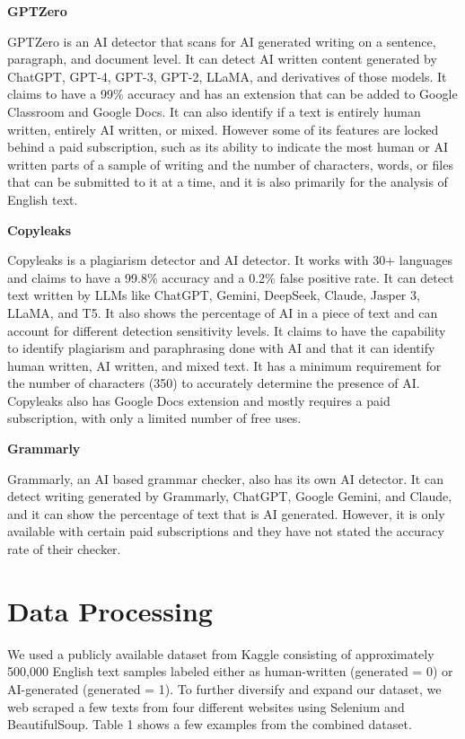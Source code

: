 \documentclass{article} %
\begin{document}
\textbf{GPTZero} ~\citep{GPTZero}

GPTZero is an AI detector that scans for AI generated writing on a sentence, paragraph, and document level. It can detect AI written content generated by ChatGPT, GPT-4, GPT-3, GPT-2, LLaMA, and derivatives of those models. It claims to have a 99\% accuracy and has an extension that can be added to Google Classroom and Google Docs. It can also identify if a text is entirely human written, entirely AI written, or mixed. However some of its features are locked behind a paid subscription, such as its ability to indicate the most human or AI written parts of a sample of writing and the number of characters, words, or files that can be submitted to it at a time, and it is also primarily for the analysis of English text.

\textbf{Copyleaks} \citep{Copyleaks}

Copyleaks is a plagiarism detector and AI detector. It works with 30+ languages and claims to have a 99.8\% accuracy and a 0.2\% false positive rate. It can detect text written by LLMs like ChatGPT, Gemini, DeepSeek, Claude, Jasper 3, LLaMA, and T5. It also shows the percentage of AI in a piece of text and can account for different detection sensitivity levels. It claims to have the capability to identify plagiarism and paraphrasing done with AI and that it can identify human written, AI written, and mixed text. It has a minimum requirement for the number of characters (350) to accurately determine the presence of AI. Copyleaks also has Google Docs extension and mostly requires a paid subscription, with only a limited number of free uses.

\textbf{Grammarly} ~\citep{Grammarly}

Grammarly, an AI based grammar checker, also has its own AI detector. It can detect writing generated by Grammarly, ChatGPT, Google Gemini, and Claude, and it can show the percentage of text that is AI generated. However, it is only available with certain paid subscriptions and they have not stated the accuracy rate of their checker.

\section{Data Processing}
We used a publicly available dataset from Kaggle consisting of approximately 500,000 English text samples labeled either as human-written (generated = 0) or AI-generated (generated = 1). To further diversify and expand our dataset, we web scraped a few texts from four different websites using Selenium and BeautifulSoup. Table 1 shows a few examples from the combined dataset. 
\end{document}
